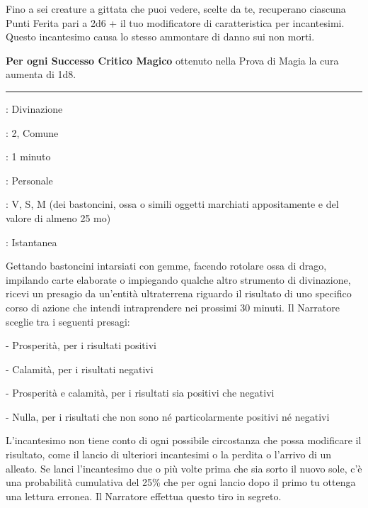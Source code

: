 \begin{multicols}{2}
Fino a sei creature a gittata che puoi vedere, scelte da te, recuperano ciascuna Punti Ferita pari a 2d6 + il tuo modificatore di caratteristica per incantesimi. Questo incantesimo causa lo stesso ammontare di danno sui non morti.

\textbf{Per ogni Successo Critico Magico} ottenuto nella Prova di Magia la cura aumenta di 1d8.

\smallskip\noindent\rule{\linewidth}{2pt} \hypertarget{Presagio}{}\smallskip{}
\noindent
\begin{description}[noitemsep, topsep=0pt, parsep=0pt, partopsep=0pt, leftmargin=0cm, labelwidth=2.8cm]
	\item[\textbf{Lista di Magia}]: Divinazione
	\item[\textbf{Livello}]: 2, Comune
	\item[\textbf{T. di Lancio}]: 1 minuto
	\item[\textbf{Gittata}]: Personale
	\item[\textbf{Componenti}]: V, S, M (dei bastoncini, ossa o simili oggetti marchiati appositamente e del valore di almeno 25 mo)
	\item[\textbf{Durata}]: Istantanea
\end{description}

Gettando bastoncini intarsiati con gemme, facendo rotolare ossa di drago, impilando carte elaborate o impiegando qualche altro strumento di divinazione, ricevi un presagio da un'entità ultraterrena riguardo il risultato di uno specifico corso di azione che intendi intraprendere nei prossimi 30 minuti. Il Narratore sceglie tra i seguenti presagi:

\medskip

- Prosperità, per i risultati positivi

- Calamità, per i risultati negativi

- Prosperità e calamità, per i risultati sia positivi che negativi

- Nulla, per i risultati che non sono né particolarmente positivi né negativi

L'incantesimo non tiene conto di ogni possibile circostanza che possa modificare il risultato, come il lancio di ulteriori incantesimi o la perdita o l'arrivo di un alleato. Se lanci l'incantesimo due o più volte prima che sia sorto il nuovo sole, c'è una probabilità cumulativa del 25\% che per ogni lancio dopo il primo tu ottenga una lettura erronea. Il Narratore effettua questo tiro in segreto.


\end{multicols}

